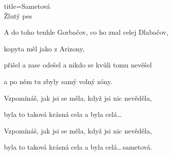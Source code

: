 \begin{song}{title=\centering Sametová \\\normalsize Žlutý pes  \vspace*{-0.3cm}}
{\sloka
	A do toho tenhle Gorbačov, co ho znal celej Dlabačov,
	
	kopyta měl jako z Arizony,
	
	přišel a zase odešel a nikdo se kvůli tomu nevěšel
	
	a po něm tu zbyly samý volný zóny.

	Vzpomínáš, jak jsi se měla, když jsi nic nevěděla,
	
	byla to taková krásná cela a byla celá\elipsa\dots\,
	 
	Vzpomínáš, jak jsi se měla, když jsi nic nevěděla,
	
	byla to taková krásná cela a byla celá\elipsa\dots\,sametová.

}
\setcounter{Slokočet}{0}
\end{song}


